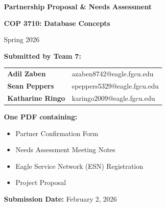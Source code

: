\documentclass[11pt]{article}
\begin{document}
\begin{titlepage}
    \centering
    \vspace*{2cm}
    
    {\Huge \textbf{Partnership Proposal \& Needs Assessment}}
    
    \vspace{1.5cm}
    
    {\Large \textbf{COP 3710: Database Concepts}}
    
    \vspace{0.5cm}
    {\large Spring 2026}
    
    \vspace{2cm}
    
    \textbf{Submitted by Team 7:}
    
    \vspace{0.5cm}
    
    \begin{tabular}{ll}
        \textbf{Adil Zaben} & azaben8742@eagle.fgcu.edu \\
        \textbf{Sean Peppers} & speppers5329@eagle.fgcu.edu \\
        \textbf{Katharine Ringo} & karingo2009@eagle.fgcu.edu \\
    \end{tabular}
    
    \vspace{2cm}
    
    \textbf{One PDF containing:}
    \begin{itemize}
        \item Partner Confirmation Form
        \item Needs Assessment Meeting Notes
        \item Eagle Service Network (ESN) Registration
        \item Project Proposal
    \end{itemize}
    
    \vfill
    
    \textbf{Submission Date:} February 2, 2026
    
\end{titlepage}

\newpage

\end{document}
